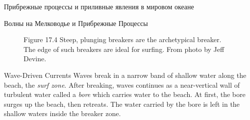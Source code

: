 \begin{chapter}{Прибрежные процессы и приливные явления в мировом океане}
\begin{section}{Волны на Мелководье и Прибрежные Процессы}
\begin{figure}[t!]
\caption{Figure 17.4 Steep, plunging breakers
are the archetypical breaker. The edge of such breakers are ideal for
surfing. From photo by Jeff Devine.}
\label{fig:wavecropped}
\end{figure}
%
%

\begin{paragraph}{Wave-Driven Currents}
Waves break in a
narrow band of shallow water along the beach, the \textit{surf
zone}. After breaking, waves continues as a
near-vertical wall of turbulent water called a
\textit{bore} which carries water to the beach. At
first, the bore surges up the beach, then retreats. The water carried
by the bore is left in the shallow waters inside the
breaker zone.
%


\end{paragraph}
\end{section}
\end{chapter}
